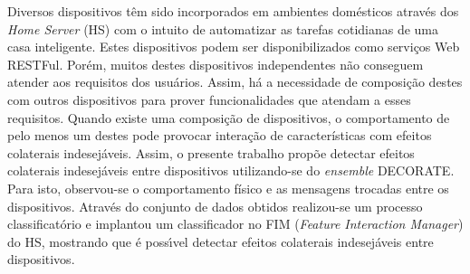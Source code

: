 Diversos dispositivos têm sido incorporados em ambientes domésticos através dos \textit{Home Server} (HS) com o intuito de automatizar as tarefas cotidianas de uma casa inteligente. Estes dispositivos podem ser disponibilizados como serviços Web RESTFul. Porém, muitos destes dispositivos independentes não conseguem atender aos requisitos dos usuários. Assim, há a necessidade de composição destes com outros dispositivos para prover funcionalidades que atendam a esses requisitos. Quando existe uma composição de dispositivos, o comportamento de pelo menos um destes pode provocar interação de características com efeitos colaterais indesejáveis. Assim, o presente trabalho propõe detectar efeitos colaterais indesejáveis entre dispositivos utilizando-se do \textit{ensemble} DECORATE. Para isto, observou-se o comportamento físico e as mensagens trocadas entre os dispositivos. Através do conjunto de dados obtidos realizou-se um processo classificatório e implantou um classificador no FIM (\textit{Feature Interaction Manager}) do HS, mostrando que é possı́vel detectar efeitos colaterais indesejáveis entre dispositivos.
